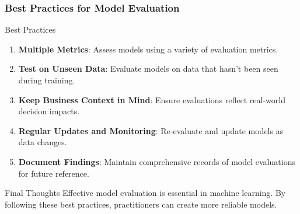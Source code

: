 \documentclass{beamer}
\begin{document}
\begin{frame}[fragile]
    \frametitle{Best Practices for Model Evaluation}
    \begin{block}{Best Practices}
        \begin{enumerate}
            \item \textbf{Multiple Metrics}: Assess models using a variety of evaluation metrics.
            \item \textbf{Test on Unseen Data}: Evaluate models on data that hasn't been seen during training.
            \item \textbf{Keep Business Context in Mind}: Ensure evaluations reflect real-world decision impacts.
            \item \textbf{Regular Updates and Monitoring}: Re-evaluate and update models as data changes.
            \item \textbf{Document Findings}: Maintain comprehensive records of model evaluations for future reference.
        \end{enumerate}
    \end{block}
    
    \begin{block}{Final Thoughts}
        Effective model evaluation is essential in machine learning. By following these best practices, practitioners can create more reliable models.
    \end{block}
\end{frame}
\end{document}
